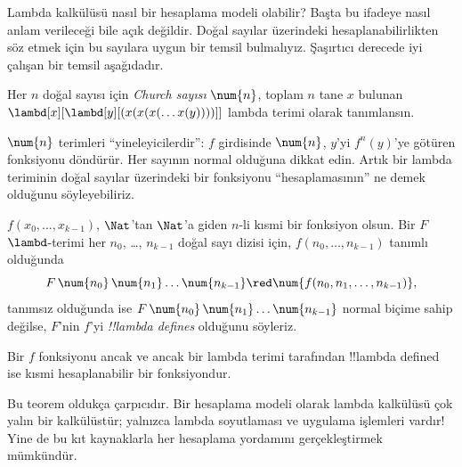 \documentclass[../../../include/open-logic-section]{subfiles}
\begin{document}

Lambda kalkülüsü nasıl bir hesaplama modeli olabilir? Başta bu ifadeye nasıl
anlam verileceği bile açık değildir. Doğal sayılar üzerindeki
hesaplanabilirlikten söz etmek için bu sayılara uygun bir temsil bulmalıyız.
Şaşırtıcı derecede iyi çalışan bir temsil aşağıdadır.

\begin{defn}
Her $n$ doğal sayısı için \emph{Church sayısı} $\num{n}$, toplam $n$ tane
$x$ bulunan $\lambd[x][\lambd[y][(x(x(x(\dots x(y))))]]$ lambda terimi
olarak tanımlansın.
\end{defn}

$\num{n}$ terimleri ``yineleyicilerdir'': $f$ girdisinde $\num{n}$, $y$'yi
$f^n(y)$'ye götüren fonksiyonu döndürür. Her sayının normal olduğuna dikkat
edin. Artık bir lambda teriminin doğal sayılar üzerindeki bir fonksiyonu
``hesaplamasının'' ne demek olduğunu söyleyebiliriz.

\begin{defn}
$f(x_0,\dots,x_{k-1})$, $\Nat$'tan $\Nat$'a giden $n$-li kısmi bir fonksiyon
olsun. Bir $F$ $\lambd$-terimi her $n_0$, \dots, $n_{k-1}$ doğal sayı dizisi
için, $f(n_0,\dots,n_{k-1})$ tanımlı olduğunda
\[
F\, \num{n_0}\, \num{n_1} \dots \num{n_{k-1}} \red \num{f(n_0, n_1, \dots,
  n_{k-1})},
\]
tanımsız olduğunda ise $F\,\num{n_0}\,\num{n_1}\dots\num{n_{k-1}}$ normal
biçime sahip değilse, $F$'nin $f$'yi \emph{!!{lambda define}s} olduğunu
söyleriz.
\end{defn}

\begin{thm}
Bir $f$ fonksiyonu ancak ve ancak bir lambda terimi tarafından
!!{lambda defined} ise kısmi hesaplanabilir bir fonksiyondur.
\end{thm}

\begin{explain}
Bu teorem oldukça çarpıcıdır. Bir hesaplama modeli olarak lambda kalkülüsü
çok yalın bir kalkülüstür; yalnızca lambda soyutlaması ve uygulama işlemleri
vardır!{} Yine de bu kıt kaynaklarla her hesaplama yordamını gerçekleştirmek
mümkündür.
\end{explain}
\end{document}
